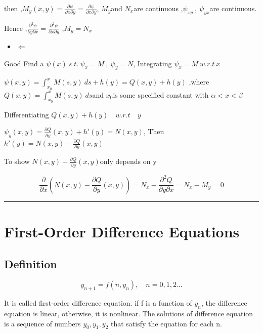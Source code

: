 \documentclass[12pt, a4paper]{article}
\theoremstyle{break}
\providecommand{\tightlist}{\setlength{\itemsep}{0pt}\setlength{\parskip}{0pt}}
\begin{document}
then ,\(M_y(x ,y) = \frac{\partial \psi}{\partial x\partial y} = \frac{\partial \psi}{\partial x \partial y}\), \(M_y\)and \(N_x\)are continuous ,\(\psi_{xy} \ ,\  \psi_{yx}\)are continuous.

Hence ,\(\frac{\partial^2 \psi}{\partial y \partial x} = \frac{\partial^2 \psi}{\partial x \partial y}\) ,\(M_y = N_x\)

\begin{itemize}
\tightlist
\item
  \(\Longleftarrow\)
\end{itemize}

Good Find a \(\psi(x) \ s.t. \ \psi_x = M\ ,\ \psi_y = N\), Integrating \(\psi_x = M \ w.r.t \ x\)

\(\psi(x ,y) = \int_{x_0}^{x}M(s ,y)\ ds + h(y) = Q(x ,y) + h(y)\) ,where \(Q(x ,y) = \int_{x_0}^{x} M(s ,y)\ ds\)and \(x_0\)is some specified constant with \(\alpha < x < \beta\)

Differentiating \(Q(x ,y) + h(y) \quad w.r.t \quad y\)

\(\psi_y(x ,y) = \frac{\partial Q}{\partial y}(x ,y) + h'(y) = N(x ,y)\), Then \(h'(y) = N(x ,y) - \frac{\partial Q}{\partial y}(x ,y)\)

To show \(N(x ,y) - \frac{\partial Q}{\partial y}(x ,y)\)only depends on y

\[
\frac{\partial}{\partial x}(N(x ,y) - \frac{\partial Q}{\partial y}(x ,y)) = N_x - \frac{\partial^2Q}{\partial y \partial x} = N_x - M_y = 0
\]

\begin{center}\rule{0.5\linewidth}{0.5pt}\end{center}

\section{First-Order Difference Equations}\label{first-order-difference-equations}

\subsection{Definition}\label{definition}

\[
y_{n+1} = f(n ,y_n) ,\quad n = 0 ,1 ,2...
\]

It is called first-order difference equation. if f is a function of \(y_n\), the difference equation is linear, otherwise, it is nonlinear. The solutions of difference equation is a sequence of numbers \(y_0 ,y_1 ,y_2\) that satisfy the equation for each n.
\end{document}
